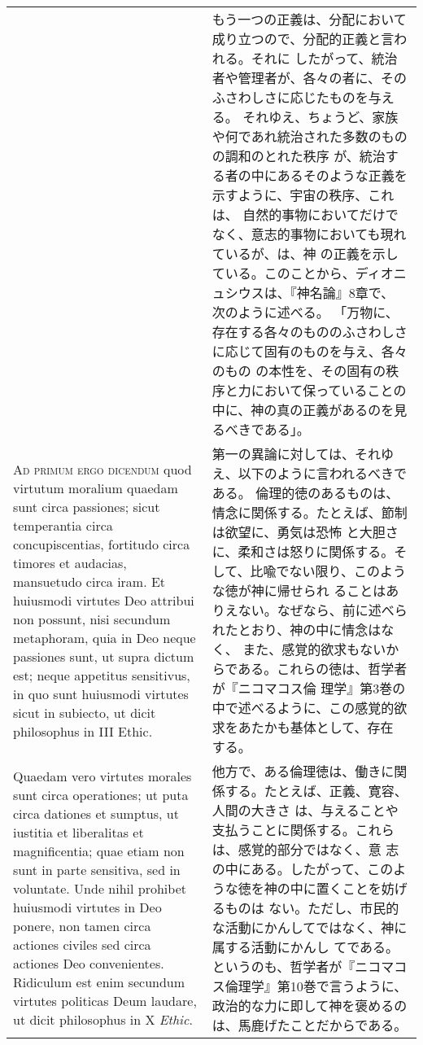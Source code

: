 \documentclass[10pt]{jsarticle} %
\begin{document}
{\begin{longtable}{p{21em}p{21em}}
&

もう一つの正義は、分配において成り立つので、分配的正義と言われる。それに
 したがって、統治者や管理者が、各々の者に、そのふさわしさに応じたものを与える。
それゆえ、ちょうど、家族や何であれ統治された多数のものの調和のとれた秩序
 が、統治する者の中にあるそのような正義を示すように、宇宙の秩序、これは、
 自然的事物においてだけでなく、意志的事物においても現れているが、は、神
 の正義を示している。このことから、ディオニュシウスは、『神名論』8章で、
 次のように述べる。
「万物に、存在する各々のもののふさわしさに応じて固有のものを与え、各々のもの
 の本性を、その固有の秩序と力において保っていることの中に、神の真の正義があるのを見るべきである」。


\\


{\scshape Ad primum ergo dicendum} quod virtutum
moralium quaedam sunt circa passiones; sicut temperantia circa
concupiscentias, fortitudo circa timores et audacias, mansuetudo circa
iram. Et huiusmodi virtutes Deo attribui non possunt, nisi secundum
metaphoram, quia in Deo neque passiones sunt, ut supra dictum est; neque
appetitus sensitivus, in quo sunt huiusmodi virtutes sicut in subiecto,
ut dicit philosophus in III Ethic. 

&

第一の異論に対しては、それゆえ、以下のように言われるべきである。
倫理的徳のあるものは、情念に関係する。たとえば、節制は欲望に、勇気は恐怖
 と大胆さに、柔和さは怒りに関係する。そして、比喩でない限り、このような徳が神に帰せられ
 ることはありえない。なぜなら、前に述べられたとおり、神の中に情念はなく、
 また、感覚的欲求もないからである。これらの徳は、哲学者が『ニコマコス倫
 理学』第3巻の中で述べるように、この感覚的欲求をあたかも基体として、存在
 する。

\\


Quaedam vero virtutes morales sunt
circa operationes; ut puta circa dationes et sumptus, ut iustitia et
liberalitas et magnificentia; quae etiam non sunt in parte sensitiva,
sed in voluntate. Unde nihil prohibet huiusmodi virtutes in Deo ponere,
non tamen circa actiones civiles sed circa actiones Deo
convenientes. Ridiculum est enim secundum virtutes politicas Deum
laudare, ut dicit philosophus in X {\itshape Ethic}.

&

他方で、ある倫理徳は、働きに関係する。たとえば、正義、寛容、人間の大きさ
 は、与えることや支払うことに関係する。これらは、感覚的部分ではなく、意
 志の中にある。したがって、このような徳を神の中に置くことを妨げるものは
 ない。ただし、市民的な活動にかんしてではなく、神に属する活動にかんし
 てである。というのも、哲学者が『ニコマコス倫理学』第10巻で言うように、
 政治的な力に即して神を褒めるのは、馬鹿げたことだからである。



\end{longtable}}
\end{document}

